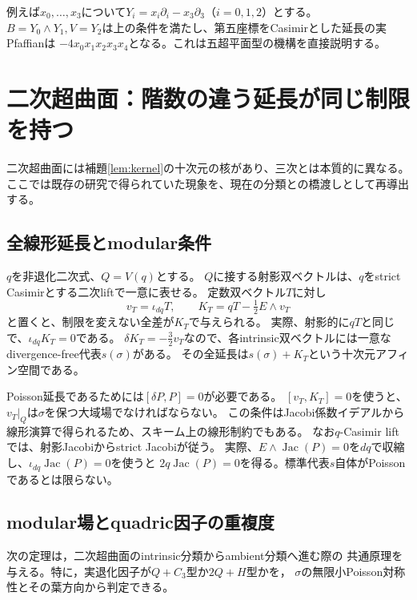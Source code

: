 \documentclass[a4paper,11pt]{ltjsarticle}
\theoremstyle{definition}
\theoremstyle{definition}\newtheorem{definition}[theorem]{定義}
\theoremstyle{remark}\newtheorem{remark}[theorem]{注意}
\newcommand{\Jac}{\operatorname{Jac}}
\begin{document}
例えば$x_0,\ldots,x_3$について$Y_i=x_i\partial_i-x_3\partial_3$（$i=0,1,2$）とする。
$B=Y_0\wedge Y_1,V=Y_2$は上の条件を満たし、第五座標をCasimirとした延長の実Pfaffianは
$-4x_0x_1x_2x_3x_4$となる。これは五超平面型の機構を直接説明する。

\section{二次超曲面：階数の違う延長が同じ制限を持つ}
二次超曲面には補題\ref{lem:kernel}の十次元の核があり、三次とは本質的に異なる。
ここでは既存の研究で得られていた現象を、現在の分類との橋渡しとして再導出する。

\subsection{全線形延長とmodular条件}
$q$を非退化二次式、$Q=V(q)$とする。
$Q$に接する射影双ベクトルは、$q$をstrict Casimirとする二次liftで一意に表せる。
定数双ベクトル$T$に対し
\[
 v_T=\iota_{dq}T,\qquad K_T=qT-\tfrac12E\wedge v_T
\]
と置くと、制限を変えない全差が$K_T$で与えられる。
実際、射影的に$qT$と同じで、$\iota_{dq}K_T=0$である。
$\delta K_T=-\tfrac32v_T$なので、各intrinsic双ベクトルには一意なdivergence-free代表$s(\sigma)$がある。
その全延長は$s(\sigma)+K_T$という十次元アフィン空間である。

Poisson延長であるためには$[\delta P,P]=0$が必要である。
$[v_T,K_T]=0$を使うと、$v_T|_Q$は$\sigma$を保つ大域場でなければならない。
この条件はJacobi係数イデアルから線形演算で得られるため、スキーム上の線形制約でもある。
なお$q$-Casimir liftでは、射影Jacobiからstrict Jacobiが従う。
実際、$E\wedge\Jac(P)=0$を$dq$で収縮し、$\iota_{dq}\Jac(P)=0$を使うと
$2q\Jac(P)=0$を得る。標準代表$s$自体がPoissonであるとは限らない。

\subsection{modular場とquadric因子の重複度}
\label{subsec:quadric-modular-multiplicity}
次の定理は，二次超曲面のintrinsic分類からambient分類へ進む際の
共通原理を与える。特に，実退化因子が$Q+C_3$型か$2Q+H$型かを，
$\sigma$の無限小Poisson対称性とその葉方向から判定できる。
\end{document}
